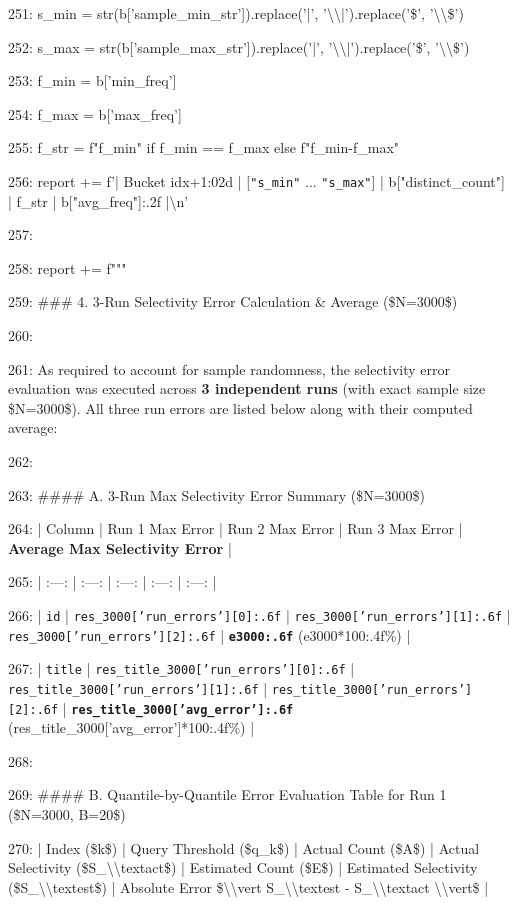 \documentclass[11pt,a4paper]{article}
\begin{document}
{251:         s\_min = str(b['sample\_min\_str']).replace('|', '\textbackslash{}\textbackslash{}|').replace('\$', '\textbackslash{}\textbackslash{}\$')

252:         s\_max = str(b['sample\_max\_str']).replace('|', '\textbackslash{}\textbackslash{}|').replace('\$', '\textbackslash{}\textbackslash{}\$')

253:         f\_min = b['min\_freq']

254:         f\_max = b['max\_freq']

255:         f\_str = f"{f\_min}" if f\_min == f\_max else f"{f\_min}-{f\_max}"

256:         report += f'| Bucket {idx+1:02d} | [\texttt{"{s\_min}"} ... \texttt{"{s\_max}"}] | {b["distinct\_count"]} | {f\_str} | {b["avg\_freq"]:.2f} |\textbackslash{}n'

257:

258:     report += f"""

259: \#\#\# 4. 3-Run Selectivity Error Calculation \& Average (\$N=3000\$)

260:

261: As required to account for sample randomness, the selectivity error evaluation was executed across \textbf{3 independent runs} (with exact sample size \$N=3000\$). All three run errors are listed below along with their computed average:

262:

263: \#\#\#\# A. 3-Run Max Selectivity Error Summary (\$N=3000\$)

264: | Column | Run 1 Max Error | Run 2 Max Error | Run 3 Max Error | \textbf{Average Max Selectivity Error} |

265: | :---: | :---: | :---: | :---: | :---: |

266: | \texttt{id} | \texttt{{res\_3000['run\_errors'][0]:.6f}} | \texttt{{res\_3000['run\_errors'][1]:.6f}} | \texttt{{res\_3000['run\_errors'][2]:.6f}} | \textbf{\texttt{{e3000:.6f}}} ({e3000*100:.4f}\%) |

267: | \texttt{title} | \texttt{{res\_title\_3000['run\_errors'][0]:.6f}} | \texttt{{res\_title\_3000['run\_errors'][1]:.6f}} | \texttt{{res\_title\_3000['run\_errors'][2]:.6f}} | \textbf{\texttt{{res\_title\_3000['avg\_error']:.6f}}} ({res\_title\_3000['avg\_error']*100:.4f}\%) |

268:

269: \#\#\#\# B. Quantile-by-Quantile Error Evaluation Table for Run 1 (\$N=3000, B=20\$)

270: | Index (\$k\$) | Query Threshold (\$q\_k\$) | Actual Count (\$A\$) | Actual Selectivity (\$S\_{{\textbackslash{}\textbackslash{}text{{act}}}}\$) | Estimated Count (\$E\$) | Estimated Selectivity (\$S\_{{\textbackslash{}\textbackslash{}text{{est}}}}\$) | Absolute Error \$\textbackslash{}\textbackslash{}vert S\_{{\textbackslash{}\textbackslash{}text{{est}}}} - S\_{{\textbackslash{}\textbackslash{}text{{act}}}} \textbackslash{}\textbackslash{}vert\$ |

}
\end{document}
